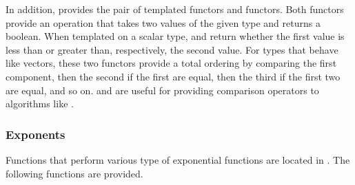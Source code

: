 In addition,  provides the pair of templated
functors  and  functors. Both
functors provide an operation that takes two values of the given type and
returns a boolean. When templated on a scalar type,
 and  return whether
the first value is less than or greater than, respectively, the second
value. For types that behave like vectors, these two functors provide a
total ordering by comparing the first component, then the second if the
first are equal, then the third if the first two are equal, and so
on.  and  are useful
for providing comparison operators to algorithms like .

\subsubsection{Exponents}

Functions that perform various type of exponential functions are located in
. The following functions are provided.

